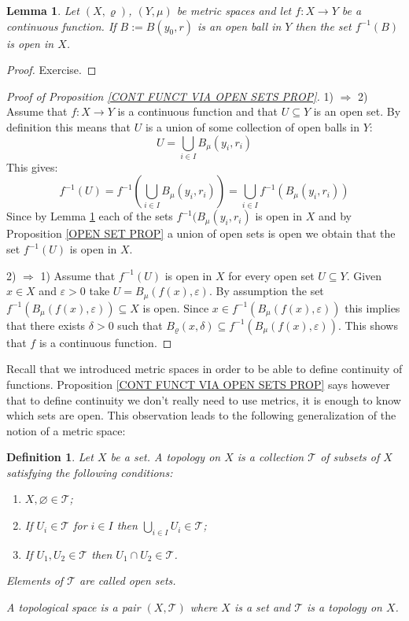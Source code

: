 \documentclass[11pt, letterpaper, oneside]{report}
\theoremstyle{pplain}
\newtheorem{lemma}[theorem]{Lemma}
\newtheorem{ITERMVALUE THM}[theorem]{Intermediate Value Theorem}
\newtheorem{HEINEBOREL THM}[theorem]{Heine-Borel Theorem}
\newtheorem{UMETR THM}[theorem]{Urysohn Metrization Theorem}
\newtheorem{UMETR2 THM}[theorem]{Urysohn Metrization Theorem (v.2)}
\theoremstyle{ddefinition}
\newtheorem{definition}[theorem]{Definition}
\theoremstyle{nnn}
\newtheorem{TDA NN}[theorem]{Topological Data Analysis. }
\theoremstyle{eexercise}
\newcommand{\Ra}{\Rightarrow}
\newcommand{\TT}{{\mathcal T}}
\begin{document}
\begin{lemma}
\label{INV IMG OPEN BALL LEMMA}
Let $(X, \varrho)$, $(Y, \mu)$ be metric spaces and let $f\colon X\to Y$ be a continuous function. 
If $B:= B(y_{0}, r)$ is an open ball in $Y$ then the set $f^{-1}(B)$ is open in $X$. 
\end{lemma}

\begin{proof}
Exercise.
\end{proof}


\begin{proof}[Proof of Proposition \ref{CONT FUNCT VIA OPEN SETS PROP}]
1) $\Ra$ 2) Assume that $f\colon X\to Y$ is a continuous function and that $U\subseteq Y$
is an open set. By definition this means that $U$ is a union of some collection of open balls in $Y$:
$$U = \bigcup_{i\in I} B_{\mu}(y_{i}, r_{i})$$
This gives:
$$f^{-1}(U) = f^{-1}\left(\bigcup_{i\in I} B_{\mu}(y_{i}, r_{i})\right) = \bigcup_{i\in I} f^{-1}(B_{\mu}(y_{i}, r_{i}))$$
Since by Lemma \ref{INV IMG OPEN BALL LEMMA} each of the sets $f^{-1}(B_{\mu}(y_{i}, r_{i})$ is open in 
$X$ and  by  Proposition \ref{OPEN SET PROP} a union of open sets is open we obtain that the set 
$f^{-1}(U)$ is open in $X$.   

2) $\Ra$ 1) Assume that $f^{-1}(U)$ is open in $X$ for  every open set $U\subseteq Y$. 
Given  $x\in X$ and $\varepsilon >0$ take $U = B_{\mu}(f(x), \varepsilon)$. 
By assumption the set  $f^{-1}(B_{\mu}(f(x), \varepsilon))\subseteq X$ is open. Since 
$x\in f^{-1}(B_{\mu}(f(x), \varepsilon))$ this implies that there exists $\delta > 0$
such that $B_{\varrho}(x, \delta) \subseteq  f^{-1}(B_{\mu}(f(x), \varepsilon))$. This shows that  
$f$ is a continuous function. 
\end{proof}


Recall that we introduced metric spaces in order to be able to define continuity of functions. 
Proposition \ref{CONT FUNCT VIA OPEN SETS PROP} says however that to define continuity 
we don't really need to use metrics, it is enough to know which sets are open. 
This observation leads to the following generalization of the notion of a metric space:


\begin{definition}
\label{TOPOLOGY DEF}
Let $X$ be a set. A \emph{topology} on $X$ is a collection $\TT$ of subsets of $X$
satisfying the following conditions:
\begin{enumerate}
\item $X, \varnothing\in \TT$;
\item If $U_{i}\in \TT$ for $i\in I$ then $\bigcup_{i\in I} U_{i}\in \TT$; 
\item If $U_{1}, U_{2}\in \TT$ then $U_{1}\cap U_{2}\in \TT$.
\end{enumerate}
Elements of $\TT$ are called \emph{open sets}.

A \emph{topological space} is a pair $(X, \TT)$ where $X$ is a set and $\TT$ is a topology on 
$X$. 
\end{definition}
\end{document}
